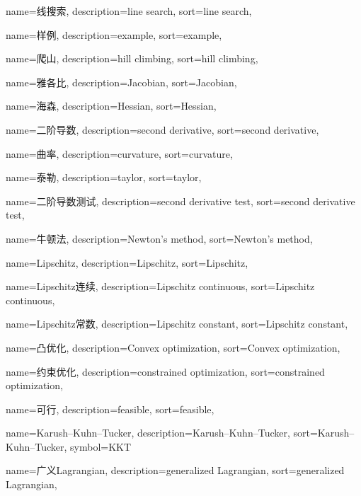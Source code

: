 {
  name=线搜索,
  description={line search},
  sort={line search},
}

{
  name=样例,
  description={example},
  sort={example},
}

{
  name=爬山,
  description={hill climbing},
  sort={hill climbing},
}

{
  name=雅各比,
  description={Jacobian},
  sort={Jacobian},
}

{
  name=海森,
  description={Hessian},
  sort={Hessian},
}

{
  name=二阶导数,
  description={second derivative},
  sort={second derivative},
}

{
  name=曲率,
  description={curvature},
  sort={curvature},
}

{
  name=泰勒,
  description={taylor},
  sort={taylor},
}

{
  name=二阶导数测试,
  description={second derivative test},
  sort={second derivative test},
}

{
  name=牛顿法,
  description={Newton's method},
  sort={Newton's method},
}

{
  name=Lipschitz,
  description={Lipschitz},
  sort={Lipschitz},
}

{
  name=Lipschitz连续,
  description={Lipschitz continuous},
  sort={Lipschitz continuous},
}

{
  name=Lipschitz常数,
  description={Lipschitz constant},
  sort={Lipschitz constant},
}

{
  name=凸优化,
  description={Convex optimization},
  sort={Convex optimization},
}

{
  name=约束优化,
  description={constrained optimization},
  sort={constrained optimization},
}

{
  name=可行,
  description={feasible},
  sort={feasible},
}

{
  name=Karush–Kuhn–Tucker,
  description={Karush–Kuhn–Tucker},
  sort={Karush–Kuhn–Tucker},
  symbol=KKT
}

{
  name=广义Lagrangian,
  description={generalized Lagrangian},
  sort={generalized Lagrangian},
}

